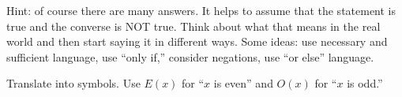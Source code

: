 \begin{questions}
  \begin{answer}
    Hint: of course there are many answers.  It helps to assume that the statement is true and the converse is NOT true.  Think about what that means in the real world and then start saying it in different ways.  Some ideas: use necessary and sufficient language, use ``only if,'' consider negations, use ``or else'' language.
  \end{answer}

  

\question Translate into symbols.  Use $E(x)$ for ``$x$ is even'' and $O(x)$ for ``$x$ is odd.''

  \begin{answer}
\end{answer}
\end{questions}
